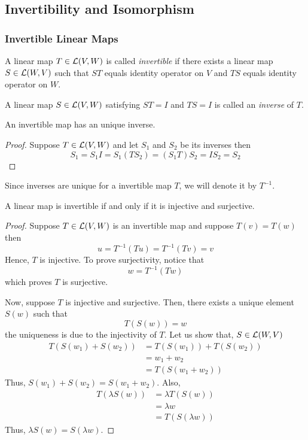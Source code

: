 \subsection{Invertibility and Isomorphism}

\subsubsection{Invertible Linear Maps}

\begin{definition} 
    A linear map $T \in \operatorname{\mathcal{L}}(V,W)$ is called \textit{invertible} if there exists a linear map $S \in \operatorname{\mathcal{L}}(W,V)$ such that $ST$ equals identity
    operator on $V$ and $TS$ equals identity operator on $W$.
\end{definition}

\begin{definition}
    A linear map $S \in \operatorname{\mathcal{L}}(V,W)$ satisfying $ST=I$ and $TS=I$ is called an \textit{inverse} of $T$.
\end{definition}

\begin{proposition}
    An invertible map has an unique inverse.
\end{proposition}

\begin{proof}
    Suppose $T \in \operatorname{\mathcal{L}}(V,W)$ and let $S_1$ and $S_2$ be its inverses then
    \[ S_1 = S_1 I = S_1 (T S_2) = (S_1 T) S_2 = IS_2 = S_2 \]
\end{proof}

\begin{remark}
    Since inverses are unique for a invertible map $T$, we will denote it by $T^{-1}$. 
\end{remark}

\begin{proposition}
    A linear map is invertible if and only if it is injective and surjective.
\end{proposition}

\begin{proof}
    Suppose $T \in \operatorname{\mathcal{L}}(V,W)$ is an invertible map and suppose $T(v)=T(w)$ then
    \[ u = T^{-1}(Tu) = T^{-1}(Tv) = v\]
    Hence, $T$ is injective. To prove surjectivity, notice that
    \[  w = T^{-1}(Tw)\]
    which proves $T$ is surjective.

    Now, suppose $T$ is injective and surjective. Then, there exists a unique element $S(w)$ such that
    \[  T(S(w))=w\]
    the uniqueness is due to the injectivity of $T$. Let us show that, $S \in \operatorname{\mathcal{L}}(W,V)$
    \begin{align*}
        T(S(w_1)+S(w_2)) &= T(S(w_1)) + T(S(w_2)) \\
        &= w_1+w_2 \\ 
        &= T(S(w_1+w_2))
    \end{align*} 
    Thus, $S(w_1) + S(w_2) = S(w_1 + w_2)$. Also,
    \begin{align*}
        T(\lambda S(w)) &= \lambda T(S(w)) \\
        &= \lambda w \\
        &= T(S(\lambda w))
    \end{align*}
    Thus, $\lambda S(w)=S(\lambda w)$.
\end{proof}


